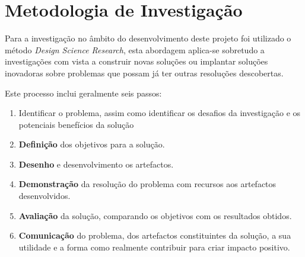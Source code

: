 \section{Metodologia de Investigação}
Para a investigação no âmbito do desenvolvimento deste projeto foi utilizado o método \emph{Design Science Research}, esta abordagem aplica-se sobretudo a investigações com vista a construir novas soluções ou implantar soluções inovadoras sobre problemas que possam já ter outras resoluções descobertas\cite{design_science_research}.

Este processo inclui geralmente seis passos\cite{design_science_research}:
\begin{enumerate}
    \item Identificar o problema, assim como identificar os desafios da investigação e os potenciais benefícios da solução
    \item \textbf{Definição} dos objetivos para a solução.
    \item \textbf{Desenho} e desenvolvimento os artefactos.
    \item \textbf{Demonstração} da resolução do problema com recursos aos artefactos desenvolvidos.
    \item \textbf{Avaliação} da solução, comparando os objetivos com os resultados obtidos.
    \item \textbf{Comunicação} do problema, dos artefactos constituintes da solução, a sua utilidade e a forma como realmente contribuir para criar impacto positivo.
\end{enumerate}

